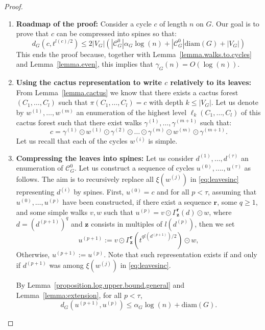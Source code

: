 \documentclass{article}
\begin{document}
\begin{proof}
\begin{enumerate}
\item \textbf{Roadmap of the proof:}
Consider a cycle $c$ of length $n$ on $G$. Our goal is to prove that $c$ can be compressed into spines so that:
\[
d_G(c, t^{l(c)/2}) \le 2|V_G|(|\mathcal{C}_G^0|\alpha_G \log(n) + |\mathcal{C}_G^0| \text{diam}(G) + |V_G|)
\]
This ends the proof because, together with Lemma~\ref{lemma.walks.to.cycles} and Lemma~\ref{lemma.even}, this implies that $\gamma_G(n) = O(\log(n))$.

\item \textbf{Using the cactus representation to write $c$ relatively to its leaves:}
From Lemma~\ref{lemma.cactus} we know that there exists a cactus forest $(C_1,\ldots,C_l)$ such that $\pi(C_1,\ldots,C_l)=c$ with depth $k\le|V_G|$. Let us denote by $w^{(1)} , \ldots , w^{(m)}$ an enumeration of the highest level $\ell_k(C_1,\ldots,C_l)$ of this cactus forest such that there exist walks $\gamma^{(1)}, \dots , \gamma^{(m+1)}$ such that: 
\begin{equation}c=\gamma^{(1)} \odot w^{(1)} \odot \gamma^{(2)} \odot \ldots \odot \gamma^{(m)} \odot w^{(m)} \odot \gamma^{(m+1)}.\label{eq:leavesinc}
\end{equation}
Let us recall that each of the cycles $w^{(i)}$ is simple.


\item \textbf{Compressing the leaves into spines:} Let us consider $d^{(1)}, \dots , d^{(\tau)}$ an enumeration of $\mathcal{C}_G^0$. Let 
us construct a sequence of cycles $u^{(0)}, \dots. , u^{(\tau)}$ as follows. 
The aim is to recursively replace all $\xi(w^{(j)})$ in \eqref{eq:leavesinc} representing $d^{(i)}$ by spines.
First, $u^{(0)} = c$ and for all $p < \tau$, assuming 
that $u^{(0)}, \dots , u^{(p)}$ have been constructed, if there exist a sequence $\textbf{r}$, some $q \ge 1$, and some simple walks $v,w$ such that 
$u^{(p)} = v \odot \Gamma^{\textbf{r}}_{\textbf{z}} (d) \odot w$, where $d = \left(d^{(p+1)}\right)^q$ and $\textbf{z}$ consists in multiples of $l\left(d^{(p)}\right)$, 
then we set 
\[u^{(p+1)} := v \odot \Gamma^{\textbf{r}}_{\textbf{z}} ( t^{ql\left(d^{(p+1)}\right)/2}) \odot w,\]
Otherwise, $u^{(p+1)} :=u^{(p)}$.
Note that such representation exists if and only if $d^{(p+1)}$ was among $\xi(w^{(j)})$ in \eqref{eq:leavesinc}.

By Lemma~\ref{proposition.log.upper.bound.general} and Lemma~\ref{lemma:extension}, for all $p < \tau$,
\[d_G(u^{(p+1)}, u^{(p)}) \le \alpha_G \log(n) + \text{diam}(G).\]


\end{enumerate}
\end{proof}
\end{document}
